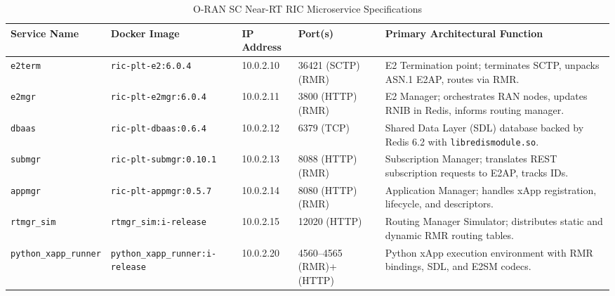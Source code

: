 \documentclass[11pt,a4paper]{article}
\begin{document}
\begin{table}[H]
\centering
\footnotesize
\caption{O-RAN SC Near-RT RIC Microservice Specifications}
\label{tab:ric_components}
\begin{tabularx}{\textwidth}{l p{2.8cm} l p{2.4cm} X}
\toprule
\textbf{Service Name} & \textbf{Docker Image} & \textbf{IP Address} & \textbf{Port(s)} & \textbf{Primary Architectural Function} \\
\midrule
\texttt{e2term} & \texttt{ric-plt-e2:6.0.4} & 10.0.2.10 & 36421 (SCTP)\newline 38000 (RMR) & E2 Termination point; terminates SCTP, unpacks ASN.1 E2AP, routes via RMR. \\
\texttt{e2mgr} & \texttt{ric-plt-e2mgr:6.0.4} & 10.0.2.11 & 3800 (HTTP)\newline 3801 (RMR) & E2 Manager; orchestrates RAN nodes, updates RNIB in Redis, informs routing manager. \\
\texttt{dbaas} & \texttt{ric-plt-dbaas:0.6.4} & 10.0.2.12 & 6379 (TCP) & Shared Data Layer (SDL) database backed by Redis 6.2 with \texttt{libredismodule.so}. \\
\texttt{submgr} & \texttt{ric-plt-submgr:0.10.1} & 10.0.2.13 & 8088 (HTTP)\newline 4560 (RMR) & Subscription Manager; translates REST subscription requests to E2AP, tracks IDs. \\
\texttt{appmgr} & \texttt{ric-plt-appmgr:0.5.7} & 10.0.2.14 & 8080 (HTTP)\newline 4561 (RMR) & Application Manager; handles xApp registration, lifecycle, and descriptors. \\
\texttt{rtmgr\_sim} & \texttt{rtmgr\_sim:i-release} & 10.0.2.15 & 12020 (HTTP) & Routing Manager Simulator; distributes static and dynamic RMR routing tables. \\
\texttt{python\_xapp\_runner} & \texttt{python\_xapp\_runner:i-release} & 10.0.2.20 & 4560--4565 (RMR)\newline 8090+ (HTTP) & Python xApp execution environment with RMR bindings, SDL, and E2SM codecs. \\
\bottomrule
\end{tabularx}
\end{table}
\end{document}
